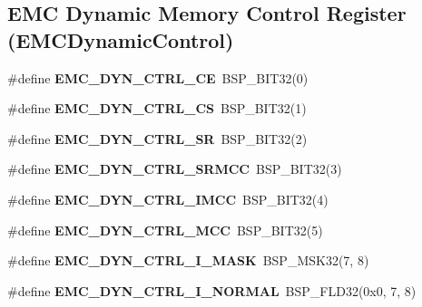 \subsection*{E\+MC Dynamic Memory Control Register (E\+M\+C\+Dynamic\+Control)}
\begin{DoxyCompactItemize}
\item 
\mbox{\label{group__lpc__emc_ga36aae214b13a86616969ef6d1ad5b8bd}} 
\#define {\bfseries E\+M\+C\+\_\+\+D\+Y\+N\+\_\+\+C\+T\+R\+L\+\_\+\+CE}~B\+S\+P\+\_\+\+B\+I\+T32(0)
\item 
\mbox{\label{group__lpc__emc_ga6c7bab4f9ff367cf3fa24d2307e2224f}} 
\#define {\bfseries E\+M\+C\+\_\+\+D\+Y\+N\+\_\+\+C\+T\+R\+L\+\_\+\+CS}~B\+S\+P\+\_\+\+B\+I\+T32(1)
\item 
\mbox{\label{group__lpc__emc_ga660d4d5d569874c1ba8c826445cba5be}} 
\#define {\bfseries E\+M\+C\+\_\+\+D\+Y\+N\+\_\+\+C\+T\+R\+L\+\_\+\+SR}~B\+S\+P\+\_\+\+B\+I\+T32(2)
\item 
\mbox{\label{group__lpc__emc_gadf9d7b44918d6c5b1e7ddcb20a8ffe87}} 
\#define {\bfseries E\+M\+C\+\_\+\+D\+Y\+N\+\_\+\+C\+T\+R\+L\+\_\+\+S\+R\+M\+CC}~B\+S\+P\+\_\+\+B\+I\+T32(3)
\item 
\mbox{\label{group__lpc__emc_ga9761dfa427785912d92edd6601224393}} 
\#define {\bfseries E\+M\+C\+\_\+\+D\+Y\+N\+\_\+\+C\+T\+R\+L\+\_\+\+I\+M\+CC}~B\+S\+P\+\_\+\+B\+I\+T32(4)
\item 
\mbox{\label{group__lpc__emc_ga45fe7e07c0cb82b6b2d296bce75c81de}} 
\#define {\bfseries E\+M\+C\+\_\+\+D\+Y\+N\+\_\+\+C\+T\+R\+L\+\_\+\+M\+CC}~B\+S\+P\+\_\+\+B\+I\+T32(5)
\item 
\mbox{\label{group__lpc__emc_gacbb7898103d3e89fc72ae454fcf1e3b9}} 
\#define {\bfseries E\+M\+C\+\_\+\+D\+Y\+N\+\_\+\+C\+T\+R\+L\+\_\+\+I\+\_\+\+M\+A\+SK}~B\+S\+P\+\_\+\+M\+S\+K32(7, 8)
\item 
\mbox{\label{group__lpc__emc_gacab6fe7a763acf6d1e941f8f9d99f022}} 
\#define {\bfseries E\+M\+C\+\_\+\+D\+Y\+N\+\_\+\+C\+T\+R\+L\+\_\+\+I\+\_\+\+N\+O\+R\+M\+AL}~B\+S\+P\+\_\+\+F\+L\+D32(0x0, 7, 8)
\item 

\end{DoxyCompactItemize}
